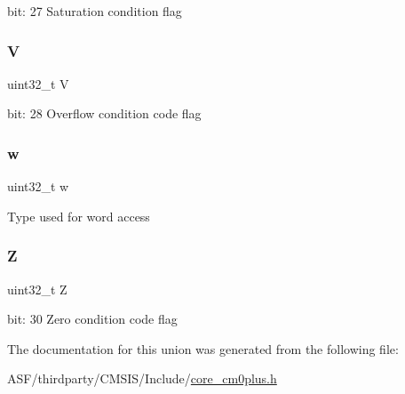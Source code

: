 bit\+: 27 Saturation condition flag \mbox{\label{union_a_p_s_r___type_acd4a2b64faee91e4a9eef300667fa222}} 
\subsubsection{\texorpdfstring{V}{V}}
{\footnotesize\ttfamily uint32\+\_\+t V}

bit\+: 28 Overflow condition code flag \mbox{\label{union_a_p_s_r___type_ad0fb62e7a08e70fc5e0a76b67809f84b}} 
\subsubsection{\texorpdfstring{w}{w}}
{\footnotesize\ttfamily uint32\+\_\+t w}

Type used for word access \mbox{\label{union_a_p_s_r___type_a5ae954cbd9986cd64625d7fa00943c8e}} 
\subsubsection{\texorpdfstring{Z}{Z}}
{\footnotesize\ttfamily uint32\+\_\+t Z}

bit\+: 30 Zero condition code flag 

The documentation for this union was generated from the following file\+:\begin{DoxyCompactItemize}
\item 
A\+S\+F/thirdparty/\+C\+M\+S\+I\+S/\+Include/\mbox{\hyperlink{core__cm0plus_8h}{core\+\_\+cm0plus.\+h}}\end{DoxyCompactItemize}
